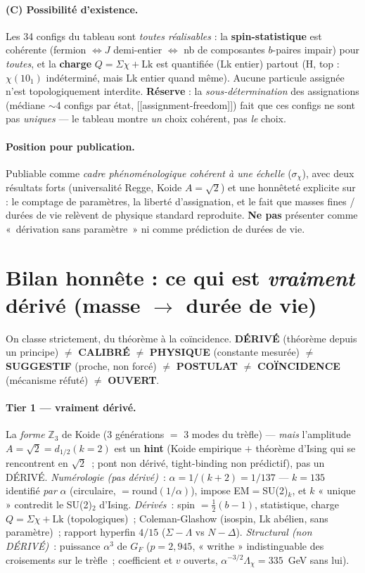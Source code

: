\documentclass[11pt]{article}
\begin{document}
\paragraph{(C) Possibilité d'existence.} Les 34 configs du tableau sont \emph{toutes réalisables} : la \textbf{spin-statistique} est cohérente (fermion $\Leftrightarrow J$ demi-entier $\Leftrightarrow$ nb de composantes $b$-paires impair) pour \emph{toutes}, et la \textbf{charge} $Q=\Sigma\chi+\mathrm{Lk}$ est quantifiée (Lk entier) partout (H, top : $\chi(10_1)$ indéterminé, mais Lk entier quand même). Aucune particule assignée n'est topologiquement interdite. \textbf{Réserve} : la \emph{sous-détermination} des assignations (médiane $\sim$4 configs par état, [[assignment-freedom]]) fait que ces configs ne sont pas \emph{uniques} --- le tableau montre \emph{un} choix cohérent, pas \emph{le} choix.

\paragraph{Position pour publication.} Publiable comme \emph{cadre phénoménologique cohérent à une échelle} ($\sigma_\chi$), avec deux résultats forts (universalité Regge, Koide $A=\sqrt2$) et une honnêteté explicite sur : le comptage de paramètres, la liberté d'assignation, et le fait que masses fines / durées de vie relèvent de physique standard reproduite. \textbf{Ne pas} présenter comme «~dérivation sans paramètre~» ni comme prédiction de durées de vie.

\section{Bilan honnête : ce qui est \emph{vraiment} dérivé (masse $\to$ durée de vie)}
On classe strictement, du théorème à la coïncidence. \textbf{DÉRIVÉ} (théorème depuis un principe)
$\neq$ \textbf{CALIBRÉ} $\neq$ \textbf{PHYSIQUE} (constante mesurée) $\neq$ \textbf{SUGGESTIF} (proche,
non forcé) $\neq$ \textbf{POSTULAT} $\neq$ \textbf{COÏNCIDENCE} (mécanisme réfuté) $\neq$ \textbf{OUVERT}.

\paragraph{Tier 1 --- vraiment dérivé.} La \emph{forme} $\mathbb{Z}_3$ de Koide (3 générations $=$
3 modes du trèfle) --- \emph{mais} l'amplitude $A=\sqrt2=d_{1/2}(k{=}2)$ est un \textbf{hint} (Koide
empirique $+$ théorème d'Ising qui se rencontrent en $\sqrt2$~; pont non dérivé, tight-binding non
prédictif), pas un DÉRIVÉ. \emph{Numérologie (pas dérivé)}~: $\alpha=1/(k{+}2)=1/137$ --- $k{=}135$ identifié \emph{par} $\alpha$ (circulaire, $=$round$(1/\alpha)$), impose EM$=$SU(2)$_k$, et $k$ « unique » contredit le SU(2)$_2$ d'Ising. \emph{Dérivés}~: spin $=\tfrac12(b{-}1)$, statistique, charge
$Q=\Sigma\chi+\mathrm{Lk}$ (topologiques)~; Coleman-Glashow (isospin, $\mathrm{Lk}$ abélien, sans
paramètre)~; rapport hyperfin $4/15$ ($\Sigma{-}\Lambda$ vs $N{-}\Delta$). \emph{Structural
(non DÉRIVÉ)}~: puissance $\alpha^3$ de $G_F$ ($p{=}2{,}945$, « writhe » indistinguable des croisements
sur le trèfle~; coefficient et $v$ ouverts, $\alpha^{-3/2}\Lambda_\chi=335$~GeV sans lui).
\end{document}

